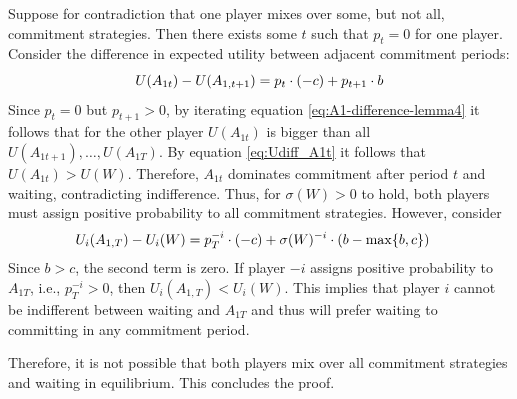 \documentclass[main.tex]{subfiles}
\begin{document}
Suppose for contradiction that one player mixes over some, but not all, commitment strategies. Then there exists some $t$ such that $p_t = 0$ for one player. Consider the difference in expected utility between adjacent commitment periods:
\begin{equation}
    U(A_{1t})-U(A_{1,t+1}) = p_t \cdot (-c) + p_{t+1} \cdot b \label{eq:A1-difference-lemma4}
\end{equation}
Since $p_t = 0$ but $p_{t+1} > 0$, by iterating equation \ref{eq:A1-difference-lemma4} it follows that for the other player $U(A_{1t})$ is bigger than all $U(A_{1t+1}),\dots,U(A_{1T})$. By equation \ref{eq:Udiff_A1t} it follows that $U(A_{1t})>U(W)$. Therefore, $A_{1t}$ dominates commitment after period $t$ and waiting, contradicting indifference. Thus, for $\sigma(W) > 0$ to hold, both players must assign positive probability to all commitment strategies.
However, consider 
\begin{align*}
    &U_i(A_{1, T}) - U_i(W) = p_{T}^{-i} \cdot (- c) + \sigma(W)^{-i} \cdot (b-\max\{b,c\})
\end{align*}
Since $b > c$, the second term is zero. If player $-i$ assigns positive probability to $A_{1T}$, i.e., $p_T^{-i} > 0$, then $U_i(A_{1,T}) < U_i(W)$. This implies that player $i$ cannot be indifferent between waiting and $A_{1T}$ and thus will prefer waiting to committing in any commitment period.

Therefore, it is not possible that both players mix over all commitment strategies and waiting in equilibrium. This concludes the proof.
\end{document}
